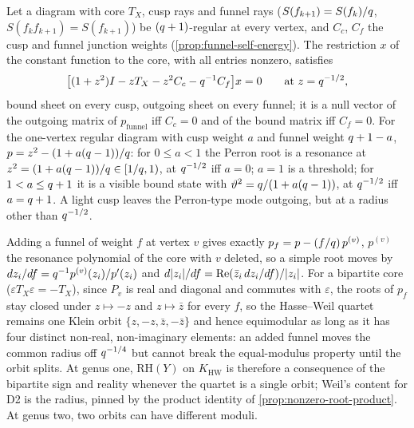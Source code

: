 \begin{proposition}
\label{prop:constant-mode-mixed-sheets}
Let a diagram with core $T_X$, cusp rays and funnel rays ($S(f_{k+1}) = S(f_k)/q$, $S(f_kf_{k+1}) = S(f_{k+1})$)
be $(q+1)$-regular at every vertex, and $C_c$, $C_f$ the cusp and funnel junction weights
(\cref{prop:funnel-self-energy}). The restriction $x$ of the constant function to the core, with all entries
nonzero, satisfies
\[
\big[(1+z^2)I - zT_X - z^2C_c - q^{-1}C_f\big]x = 0\qquad\text{at } z = q^{-1/2},
\]
bound sheet on every cusp, outgoing sheet on every funnel; it is a null vector of the outgoing matrix of
$p_{\mathrm{funnel}}$ iff $C_c = 0$ and of the bound matrix iff $C_f = 0$. For the one-vertex regular diagram with
cusp weight $a$ and funnel weight $q+1-a$, $p = z^2-(1+a(q-1))/q$: for $0\le a<1$ the Perron root is a resonance
at $z^2 = (1+a(q-1))/q\in[1/q,1)$, at $q^{-1/2}$ iff $a = 0$; $a = 1$ is a threshold; for $1<a\le q+1$ it is a
visible bound state with $\vartheta^2 = q/(1+a(q-1))$, at $q^{-1/2}$ iff $a = q+1$. A light cusp leaves the
Perron-type mode outgoing, but at a radius other than $q^{-1/2}$.
\end{proposition}

\begin{lemma}
\label{lem:funnel-first-order}
Adding a funnel of weight $f$ at vertex $v$ gives exactly $p_f = p-(f/q)\,p^{(v)}$, $p^{(v)}$ the resonance
polynomial of the core with $v$ deleted, so a simple root moves by $dz_i/df = q^{-1}p^{(v)}(z_i)/p'(z_i)$ and
$d|z_i|/df = \operatorname{Re}(\bar z_i\,dz_i/df)/|z_i|$. For a bipartite core ($\varepsilon T_X\varepsilon = -T_X$), since $P_v$ is real and diagonal and commutes with
$\varepsilon$, the roots of $p_f$ stay closed under $z\mapsto-z$ and $z\mapsto\bar z$ for every $f$, so the Hasse--Weil quartet remains one Klein orbit
$\{z,-z,\bar z,-\bar z\}$ and hence equimodular as long as it has four distinct non-real, non-imaginary elements: an
added funnel moves the common radius off $q^{-1/4}$ but cannot break the equal-modulus property until the orbit
splits. At genus one, $\mathrm{RH}(Y)$ on $K_{\mathrm{HW}}$ is therefore a consequence of the bipartite sign and reality
whenever the quartet is a single orbit; Weil's content for D2 is the radius, pinned by the product identity of
\cref{prop:nonzero-root-product}. At genus two, two orbits can have different moduli.
\end{lemma}


